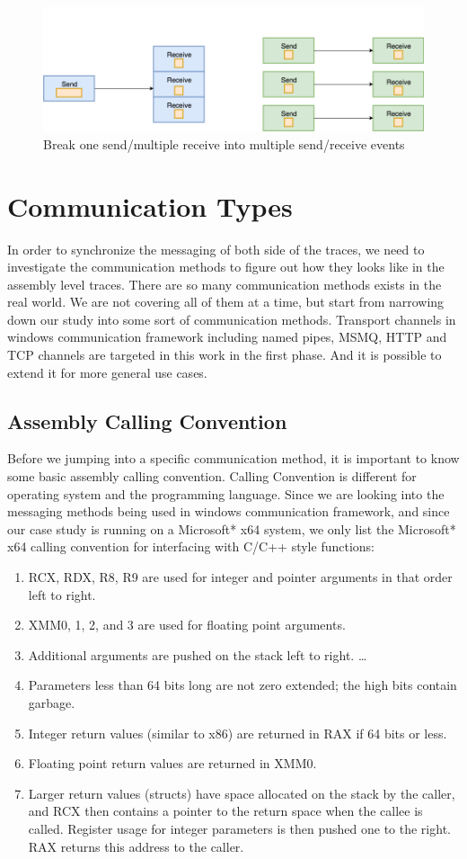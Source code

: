 \documentclass[paper=a4, fontsize=11pt]{scrartcl}
\numberwithin{equation}{section}		%
\numberwithin{figure}{section}			%
\numberwithin{table}{section}				%
\begin{document}
\begin{figure}[h]
\includegraphics[scale=.415]{event}
 \caption{Break one send/multiple receive into multiple send/receive events}
\label{event}
\end{figure}

\section{Communication Types}
In order to synchronize the messaging of both side of the traces, we need to investigate the communication methods to figure out how they looks like in the assembly level traces.
There are so many communication methods exists in the real world. We are not covering all of them at a time, but start from narrowing down our study into some sort of communication methods. Transport channels in windows communication framework including named pipes, MSMQ, HTTP and TCP channels are targeted in this work in the first phase. And it is possible to extend it for more general use cases.
\subsection{Assembly Calling Convention}
Before we jumping into a specific communication method, it is important to know some basic assembly calling convention.
Calling Convention is different for operating system and the programming language. Since we are looking into the messaging methods being used in windows communication framework, and since our case study is running on a Microsoft* x64 system, we only list the Microsoft* x64 calling convention for interfacing with C/C++ style functions:\par
\begin{enumerate}  
\item RCX, RDX, R8, R9 are used for integer and pointer arguments in that order left to right.
\item XMM0, 1, 2, and 3 are used for floating point arguments.
\item Additional arguments are pushed on the stack left to right. \ldots 
\item Parameters less than 64 bits long are not zero extended; the high bits contain garbage.
\item Integer return values (similar to x86) are returned in RAX if 64 bits or less.
\item Floating point return values are returned in XMM0.
\item Larger return values (structs) have space allocated on the stack by the caller, and RCX then contains a pointer to the return space when the callee is called. Register usage for integer parameters is then pushed one to the right. RAX returns this address to the caller.
\end{enumerate}
\end{document}
